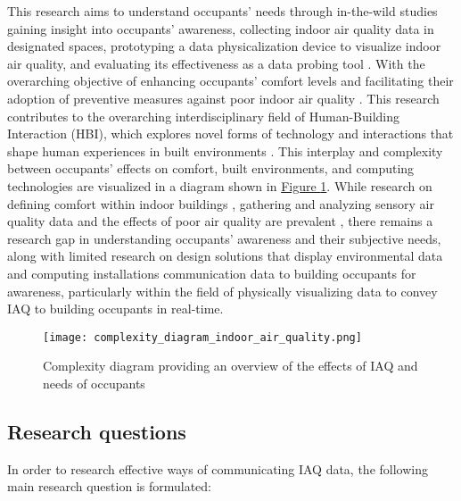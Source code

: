 This research aims to understand occupants' needs through in-the-wild \cite{rogers_moving_2017} studies gaining insight into occupants' awareness, collecting indoor air quality data in designated spaces, prototyping a data physicalization device to visualize indoor air quality, and evaluating its effectiveness as a data probing tool \cite{zimmerman_research_2007}. With the overarching objective of enhancing occupants' comfort levels and facilitating their adoption of preventive measures against poor indoor air quality \cite{zhong_complexity_2021}. This research contributes to the overarching interdisciplinary field of Human-Building Interaction (HBI), which explores novel forms of technology and interactions that shape human experiences in built environments \cite{alavi_introduction_2019}. This interplay and complexity between occupants' effects on comfort, built environments, and computing technologies are visualized in a diagram shown in \hyperref[fig:complexity]{Figure \ref*{fig:complexity}}. While research on defining comfort within indoor buildings \cite{alavi_comfort_2017}, gathering and analyzing sensory air quality data \cite{corlan_importance_2021} and the effects of poor air quality are prevalent \cite{klepeis_national_2001}, there remains a research gap in understanding occupants' awareness and their subjective needs, along with limited research on design solutions that display environmental data and computing installations communication data to building occupants for awareness, particularly within the field of physically visualizing data to convey IAQ to building occupants in real-time.

\begin{figure}[h]
    \centering
    \texttt{[image: complexity\_diagram\_indoor\_air\_quality.png]}
    \caption{Complexity diagram providing an overview of the effects of IAQ and needs of occupants \cite{schweizer_indoor_2007, wang_how_2021, kim_analyzing_2019, alavi_comfort_2017, corlan_importance_2021, klepeis_national_2001}}
    \label{fig:complexity}
\end{figure}


\subsection{Research questions}

In order to research effective ways of communicating  IAQ data, the following main research question is formulated: \\

